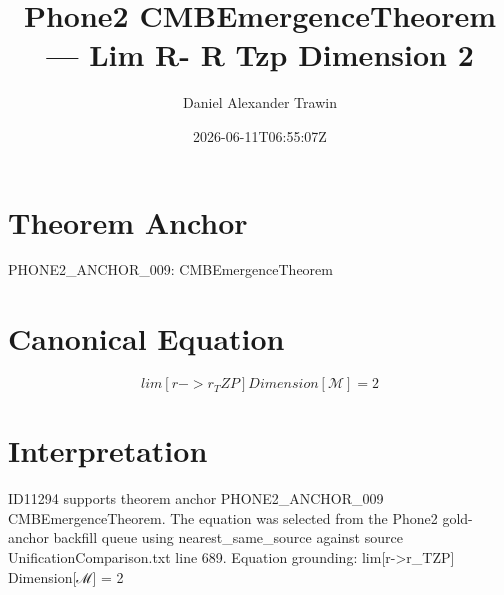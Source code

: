 \documentclass[11pt]{article}
\title{Phone2 CMBEmergenceTheorem — Lim R- R Tzp Dimension 2}
\author{Daniel Alexander Trawin}
\date{2026-06-11T06:55:07Z}
\begin{document}
\maketitle
\section*{Theorem Anchor}
PHONE2_ANCHOR_009: CMBEmergenceTheorem
\section*{Canonical Equation}
\[
lim[r->r_TZP] Dimension[ℳ] = 2
\]
\section*{Interpretation}
ID11294 supports theorem anchor PHONE2_ANCHOR_009 CMBEmergenceTheorem. The equation was selected from the Phone2 gold-anchor backfill queue using nearest_same_source against source UnificationComparison.txt line 689. Equation grounding: lim[r->r_TZP] Dimension[ℳ] = 2
\end{document}
